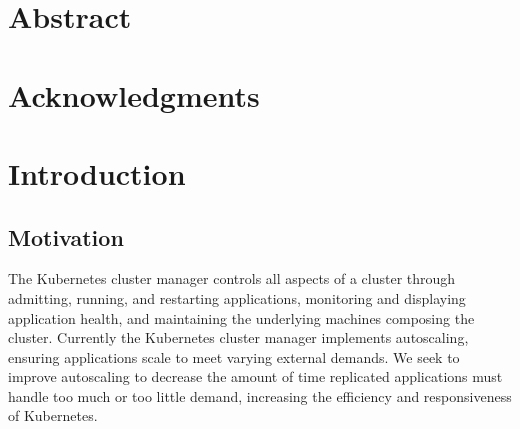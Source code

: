 \documentclass[twoside]{report}
\begin{document}

\tableofcontents

\onehalfspacing

\chapter*{Abstract}

\chapter*{Acknowledgments}



\chapter{Introduction}

\section{Motivation}

The Kubernetes cluster manager\cite{k8s-website} controls all aspects of a
cluster through admitting, running, and restarting applications, monitoring and
displaying application health, and maintaining the underlying machines composing
the cluster. Currently the Kubernetes cluster manager implements autoscaling,
ensuring applications scale to meet varying external
demands.\cite{k8s-horizontal-pod-autoscaler-proposal} We seek to
improve autoscaling to decrease the amount of time
replicated applications must handle too much or too little demand, increasing
the efficiency and responsiveness of Kubernetes.
\end{document}
